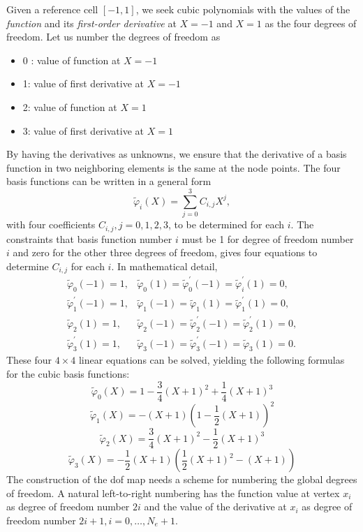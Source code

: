 \documentclass[../main.tex]{subfiles}
\begin{document}
	Given a reference cell $[-1,1]$, we seek cubic polynomials with the values of the \textit{function} and its \textit{first-order derivative} at $X=-1$ and $X=1$ as the four degrees of freedom. Let us number the degrees of freedom as
	\begin{itemize}
		\item 0 : value of function at $X=-1$
		\item 1: value of first derivative at $X=-1$
		\item 2: value of function at $X=1$
		\item 3: value of first derivative at $X=1$
	\end{itemize}
	By having the derivatives as unknowns, we ensure that the derivative of a basis function in two neighboring elements is the same at the node points.
	The four basis functions can be written in a general form
	$$
	\tilde{\varphi}_{i}(X)=\sum_{j=0}^{3} C_{i, j} X^{j},
	$$
	with four coefficients $C_{i, j}, j=0,1,2,3$, to be determined for each $i$. The constraints that basis function number $i$ must be 1 for degree of freedom number $i$ and zero for the other three degrees of freedom, gives four equations to determine $C_{i, j}$ for each $i$. In mathematical detail,
	$$
	\begin{aligned}
		\tilde{\varphi}_{0}(-1)=1, & \tilde{\varphi}_{0}(1)=\tilde{\varphi}_{0}^{\prime}(-1)=\tilde{\varphi}_{i}^{\prime}(1)=0, \\
		\tilde{\varphi}_{1}^{\prime}(-1)=1, & \tilde{\varphi}_{1}(-1)=\tilde{\varphi}_{1}(1)=\tilde{\varphi}_{1}^{\prime}(1)=0, \\
		\tilde{\varphi}_{2}(1)=1, & \tilde{\varphi}_{2}(-1)=\tilde{\varphi}_{2}^{\prime}(-1)=\tilde{\varphi}_{2}^{\prime}(1)=0, \\
		\tilde{\varphi}_{3}^{\prime}(1)=1, & \tilde{\varphi}_{3}(-1)=\tilde{\varphi}_{3}^{\prime}(-1)=\tilde{\varphi}_{3}(1)=0 .
	\end{aligned}
	$$
	These four $4 \times 4$ linear equations can be solved, yielding the following formulas for the cubic basis functions:
	\begin{equation}\label{eqa94}
		\tilde{\varphi}_{0}(X) =1-\frac{3}{4}(X+1)^{2}+\frac{1}{4}(X+1)^{3}
	\end{equation}
	\begin{equation}\label{eqa95}
		\tilde{\varphi}_{1}(X) =-(X+1)\left(1-\frac{1}{2}(X+1)\right)^{2}
	\end{equation}
	\begin{equation}\label{eqa96}
		\tilde{\varphi}_{2}(X) =\frac{3}{4}(X+1)^{2}-\frac{1}{2}(X+1)^{3}
	\end{equation}
	\begin{equation}\label{eqa97}
		\tilde{\varphi}_{3}(X) =-\frac{1}{2}(X+1)\left(\frac{1}{2}(X+1)^{2}-(X+1)\right)
	\end{equation}
	\begin{equation}\label{eqa98}
	\end{equation}	
	The construction of the dof map needs a scheme for numbering the global degrees of freedom. A natural left-to-right numbering has the function value at vertex $x_{i}$ as degree of freedom number $2 i$ and the value of the derivative at $x_{i}$ as degree of freedom number $2 i+1, i=0, \ldots, N_{e}+1$.
\clearpage
\end{document}
